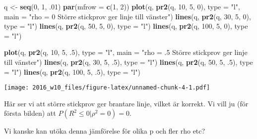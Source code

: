 \documentclass[]{article}
\newenvironment{Shaded}{\begin{snugshade}}{\end{snugshade}}
\newcommand{\KeywordTok}[1]{\textcolor[rgb]{0.13,0.29,0.53}{\textbf{{#1}}}}
\newcommand{\DataTypeTok}[1]{\textcolor[rgb]{0.13,0.29,0.53}{{#1}}}
\newcommand{\DecValTok}[1]{\textcolor[rgb]{0.00,0.00,0.81}{{#1}}}
\newcommand{\StringTok}[1]{\textcolor[rgb]{0.31,0.60,0.02}{{#1}}}
\newcommand{\NormalTok}[1]{{#1}}
\begin{document}
\begin{Shaded}
\begin{Highlighting}[]
\NormalTok{q <-}\StringTok{ }\KeywordTok{seq}\NormalTok{(}\DecValTok{0}\NormalTok{, }\DecValTok{1}\NormalTok{, .}\DecValTok{01}\NormalTok{)}
\KeywordTok{par}\NormalTok{(}\DataTypeTok{mfrow =} \KeywordTok{c}\NormalTok{(}\DecValTok{1}\NormalTok{, }\DecValTok{2}\NormalTok{))}
\KeywordTok{plot}\NormalTok{(q, }\KeywordTok{pr2}\NormalTok{(q, }\DecValTok{10}\NormalTok{, }\DecValTok{5}\NormalTok{, }\DecValTok{0}\NormalTok{), }\DataTypeTok{type =} \StringTok{"l"}\NormalTok{, }\DataTypeTok{main =} \StringTok{"rho = 0 Större stickprov ger linje till vänster"}\NormalTok{) }
\KeywordTok{lines}\NormalTok{(q, }\KeywordTok{pr2}\NormalTok{(q, }\DecValTok{30}\NormalTok{, }\DecValTok{5}\NormalTok{, }\DecValTok{0}\NormalTok{), }\DataTypeTok{type =} \StringTok{"l"}\NormalTok{) }
\KeywordTok{lines}\NormalTok{(q, }\KeywordTok{pr2}\NormalTok{(q, }\DecValTok{50}\NormalTok{, }\DecValTok{5}\NormalTok{, }\DecValTok{0}\NormalTok{), }\DataTypeTok{type =} \StringTok{"l"}\NormalTok{) }
\KeywordTok{lines}\NormalTok{(q, }\KeywordTok{pr2}\NormalTok{(q, }\DecValTok{100}\NormalTok{, }\DecValTok{5}\NormalTok{, }\DecValTok{0}\NormalTok{), }\DataTypeTok{type =} \StringTok{"l"}\NormalTok{) }

\KeywordTok{plot}\NormalTok{(q, }\KeywordTok{pr2}\NormalTok{(q, }\DecValTok{10}\NormalTok{, }\DecValTok{5}\NormalTok{, .}\DecValTok{5}\NormalTok{), }\DataTypeTok{type =} \StringTok{"l"}\NormalTok{, }\DataTypeTok{main =} \StringTok{"rho = .5 Större stickprov ger linje till vänster"}\NormalTok{) }
\KeywordTok{lines}\NormalTok{(q, }\KeywordTok{pr2}\NormalTok{(q, }\DecValTok{30}\NormalTok{, }\DecValTok{5}\NormalTok{, .}\DecValTok{5}\NormalTok{), }\DataTypeTok{type =} \StringTok{"l"}\NormalTok{) }
\KeywordTok{lines}\NormalTok{(q, }\KeywordTok{pr2}\NormalTok{(q, }\DecValTok{50}\NormalTok{, }\DecValTok{5}\NormalTok{, .}\DecValTok{5}\NormalTok{), }\DataTypeTok{type =} \StringTok{"l"}\NormalTok{) }
\KeywordTok{lines}\NormalTok{(q, }\KeywordTok{pr2}\NormalTok{(q, }\DecValTok{100}\NormalTok{, }\DecValTok{5}\NormalTok{, .}\DecValTok{5}\NormalTok{), }\DataTypeTok{type =} \StringTok{"l"}\NormalTok{) }
\end{Highlighting}
\end{Shaded}

\texttt{[image: 2016\_w10\_files/figure-latex/unnamed-chunk-4-1.pdf]}

Här ser vi att större stickprov ger brantare linje, vilket är korrekt.
Vi vill ju (för första bilden) att \(P(R^2 \leq 0|\rho^2 = 0) = 0\).

Vi kanske kan utöka denna jämförelse för olika p och fler rho etc?
\end{document}
